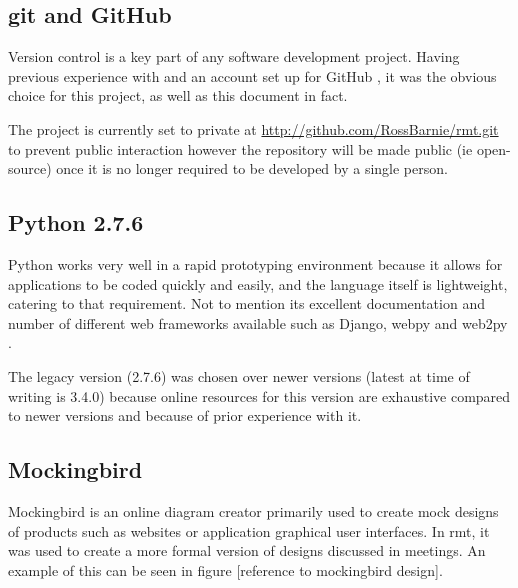 \subsection{git and GitHub}
Version control is a key part of any software development project.
Having previous experience with and an account set up for GitHub \citeyearpar{github}, it was the obvious choice for this project, as well as this document in fact.

The project is currently set to private at \url{http://github.com/RossBarnie/rmt.git} to prevent public interaction however the repository will be made public (ie open-source) once it is no longer required to be developed by a single person.

\subsection{Python 2.7.6}
Python works very well in a rapid prototyping environment because it allows for applications to be coded quickly and easily, and the language itself is lightweight, catering to that requirement.
Not to mention its excellent documentation and number of different web frameworks available such as Django\citep{django}, webpy \citep{webpy} and web2py \citeyearpar{web2py}.

The legacy version (2.7.6) was chosen over newer versions (latest at time of writing is 3.4.0) because online resources for this version are exhaustive compared to newer versions and because of prior experience with it.

\subsection{Mockingbird}
Mockingbird \citep{mockingbird} is an online diagram creator primarily used to create mock designs of products such as websites or application graphical user interfaces.
In rmt, it was used to create a more formal version of designs discussed in meetings.
An example of this can be seen in figure [reference to mockingbird design].

